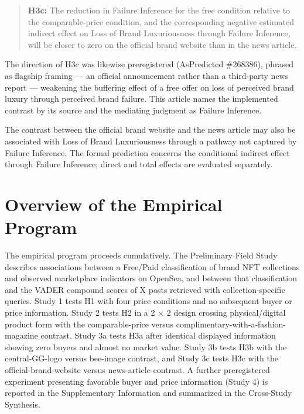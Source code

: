 \documentclass[12pt, a4paper]{article}
\begin{document}
\begin{quote}
\textbf{H3c:} The reduction in Failure Inference for the free condition relative to the comparable-price condition, and the corresponding negative estimated indirect effect on Loss of Brand Luxuriousness through Failure Inference, will be closer to zero on the official brand website than in the news article.
\end{quote}

The direction of H3c was likewise preregistered (AsPredicted \#268386), phrased as flagship framing --- an official announcement rather than a third-party news report --- weakening the buffering effect of a free offer on loss of perceived brand luxury through perceived brand failure. This article names the implemented contrast by its source and the mediating judgment as Failure Inference.

The contrast between the official brand website and the news article may also be associated with Loss of Brand Luxuriousness through a pathway not captured by Failure Inference. The formal prediction concerns the conditional indirect effect through Failure Inference; direct and total effects are evaluated separately.

\section{Overview of the Empirical Program}

The empirical program proceeds cumulatively. The Preliminary Field Study describes associations between a Free/Paid classification of brand NFT collections and observed marketplace indicators on OpenSea, and between that classification and the VADER compound scores of X posts retrieved with collection-specific queries. Study 1 tests H1 with four price conditions and no subsequent buyer or price information. Study 2 tests H2 in a 2 $\times$ 2 design crossing physical/digital product form with the comparable-price versus complimentary-with-a-fashion-magazine contrast. Study 3a tests H3a after identical displayed information showing zero buyers and almost no market value. Study 3b tests H3b with the central-GG-logo versus bee-image contrast, and Study 3c tests H3c with the official-brand-website versus news-article contrast. A further preregistered experiment presenting favorable buyer and price information (Study 4) is reported in the Supplementary Information and summarized in the Cross-Study Synthesis.
\end{document}
